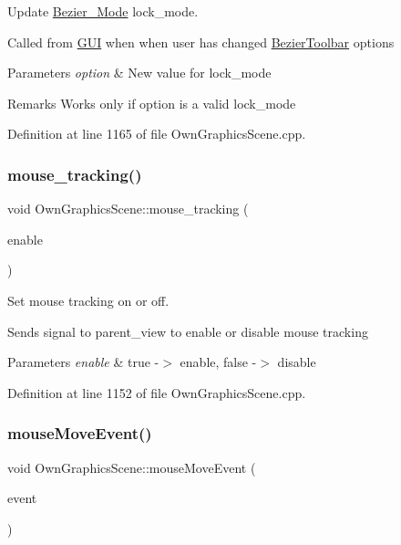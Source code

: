 Update \mbox{\hyperlink{structBezier__Mode}{Bezier\+\_\+\+Mode}} lock\+\_\+mode. 

Called from \mbox{\hyperlink{classGUI}{G\+UI}} when when user has changed \mbox{\hyperlink{structBezierToolbar}{Bezier\+Toolbar}} options 
\begin{DoxyParams}{Parameters}
{\em option} & New value for lock\+\_\+mode \\
\hline
\end{DoxyParams}
\begin{DoxyRemark}{Remarks}
Works only if option is a valid lock\+\_\+mode 
\end{DoxyRemark}


Definition at line 1165 of file Own\+Graphics\+Scene.\+cpp.

\mbox{\label{classOwnGraphicsScene_adbcfda0bade866b7e5db29b7bfb53e0c}} 
\subsubsection{\texorpdfstring{mouse\+\_\+tracking()}{mouse\_tracking()}}
{\footnotesize\ttfamily void Own\+Graphics\+Scene\+::mouse\+\_\+tracking (\begin{DoxyParamCaption}\item[{bool}]{enable }\end{DoxyParamCaption})}



Set mouse tracking on or off. 

Sends signal to parent\+\_\+view to enable or disable mouse tracking 
\begin{DoxyParams}{Parameters}
{\em enable} & true -\/$>$ enable, false -\/$>$ disable \\
\hline
\end{DoxyParams}


Definition at line 1152 of file Own\+Graphics\+Scene.\+cpp.

\mbox{\label{classOwnGraphicsScene_ac7f6be2800f09463413459fed74bf34e}} 
\subsubsection{\texorpdfstring{mouse\+Move\+Event()}{mouseMoveEvent()}}
{\footnotesize\ttfamily void Own\+Graphics\+Scene\+::mouse\+Move\+Event (\begin{DoxyParamCaption}\item[{Q\+Graphics\+Scene\+Mouse\+Event $\ast$}]{event }\end{DoxyParamCaption})}



